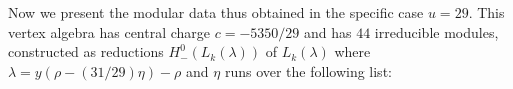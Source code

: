 \documentclass[12pt]{amsart}
\theoremstyle{plain}
\theoremstyle{definition}
\numberwithin{equation}{section}
\newcommand{\la}{\lambda}
\begin{document}
Now we present the modular data thus obtained in the specific case $u=29$. This vertex algebra has central charge $c = -5350/29$ and has $44$ irreducible modules,  constructed as reductions $H_{-}^0(L_k(\lambda))$ of $L_k(\la)$ where $\lambda = y(\rho - (31/29)\eta) - \rho$ and $\eta$ runs over the following list:
\end{document}
